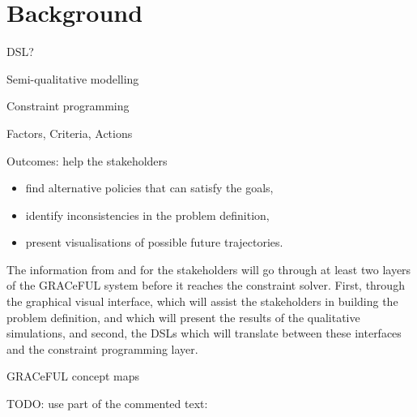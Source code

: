 \documentclass[]{article}
\begin{document}
\section{Background}


DSL?

Semi-qualitative modelling

Constraint programming

Factors, Criteria, Actions

Outcomes: help the stakeholders

\begin{itemize}
\item find alternative policies that can satisfy the goals,
\item identify inconsistencies in the problem definition,
\item  present visualisations of possible future trajectories.
\end{itemize}

The information from and for the stakeholders will go through at least
two layers of the GRACeFUL system before it reaches the constraint
solver. First, through the graphical visual interface, which will
assist the stakeholders in building the problem definition, and which
will present the results of the qualitative simulations, and second,
the DSLs which will translate between these interfaces and the
constraint programming layer.

GRACeFUL concept maps

TODO: use part of the commented text:
\end{document}

